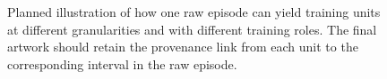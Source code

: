 \begin{figure}[t]
\centering
\fbox{\rule{0pt}{5.2cm}\rule{0.94\textwidth}{0pt}}
\caption{Planned illustration of how one raw episode can yield training units at different granularities and with different training roles. The final artwork should retain the provenance link from each unit to the corresponding interval in the raw episode.}
\label{fig:data-unit-transformation}
\end{figure}
